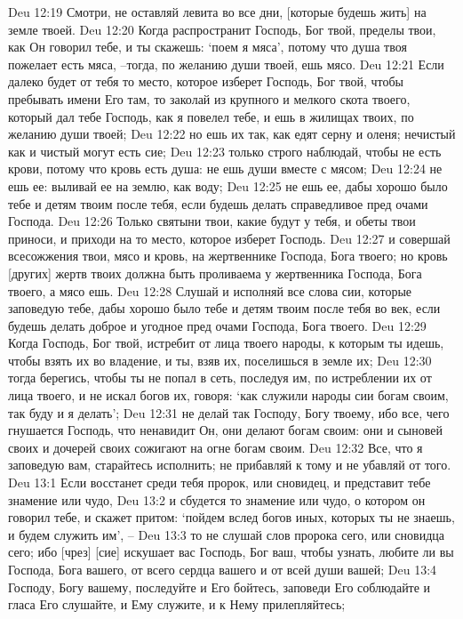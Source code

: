 Deu 12:19  Смотри, не оставляй левита во все дни, [которые будешь жить] на земле твоей.
Deu 12:20  Когда распространит Господь, Бог твой, пределы твои, как Он говорил тебе, и ты скажешь: `поем я мяса', потому что душа твоя пожелает есть мяса, --тогда, по желанию души твоей, ешь мясо.
Deu 12:21  Если далеко будет от тебя то место, которое изберет Господь, Бог твой, чтобы пребывать имени Его там, то заколай из крупного и мелкого скота твоего, который дал тебе Господь, как я повелел тебе, и ешь в жилищах твоих, по желанию души твоей;
Deu 12:22  но ешь их так, как едят серну и оленя; нечистый как и чистый могут есть сие;
Deu 12:23  только строго наблюдай, чтобы не есть крови, потому что кровь есть душа: не ешь души вместе с мясом;
Deu 12:24  не ешь ее: выливай ее на землю, как воду;
Deu 12:25  не ешь ее, дабы хорошо было тебе и детям твоим после тебя, если будешь делать справедливое пред очами Господа.
Deu 12:26  Только святыни твои, какие будут у тебя, и обеты твои приноси, и приходи на то место, которое изберет Господь.
Deu 12:27  и совершай всесожжения твои, мясо и кровь, на жертвеннике Господа, Бога твоего; но кровь [других] жертв твоих должна быть проливаема у жертвенника Господа, Бога твоего, а мясо ешь.
Deu 12:28  Слушай и исполняй все слова сии, которые заповедую тебе, дабы хорошо было тебе и детям твоим после тебя во век, если будешь делать доброе и угодное пред очами Господа, Бога твоего.
Deu 12:29  Когда Господь, Бог твой, истребит от лица твоего народы, к которым ты идешь, чтобы взять их во владение, и ты, взяв их, поселишься в земле их;
Deu 12:30  тогда берегись, чтобы ты не попал в сеть, последуя им, по истреблении их от лица твоего, и не искал богов их, говоря: `как служили народы сии богам своим, так буду и я делать';
Deu 12:31  не делай так Господу, Богу твоему, ибо все, чего гнушается Господь, что ненавидит Он, они делают богам своим: они и сыновей своих и дочерей своих сожигают на огне богам своим.
Deu 12:32  Все, что я заповедую вам, старайтесь исполнить; не прибавляй к тому и не убавляй от того.
Deu 13:1  Если восстанет среди тебя пророк, или сновидец, и представит тебе знамение или чудо,
Deu 13:2  и сбудется то знамение или чудо, о котором он говорил тебе, и скажет притом: `пойдем вслед богов иных, которых ты не знаешь, и будем служить им', --
Deu 13:3  то не слушай слов пророка сего, или сновидца сего; ибо [чрез] [сие] искушает вас Господь, Бог ваш, чтобы узнать, любите ли вы Господа, Бога вашего, от всего сердца вашего и от всей души вашей;
Deu 13:4  Господу, Богу вашему, последуйте и Его бойтесь, заповеди Его соблюдайте и гласа Его слушайте, и Ему служите, и к Нему прилепляйтесь;
